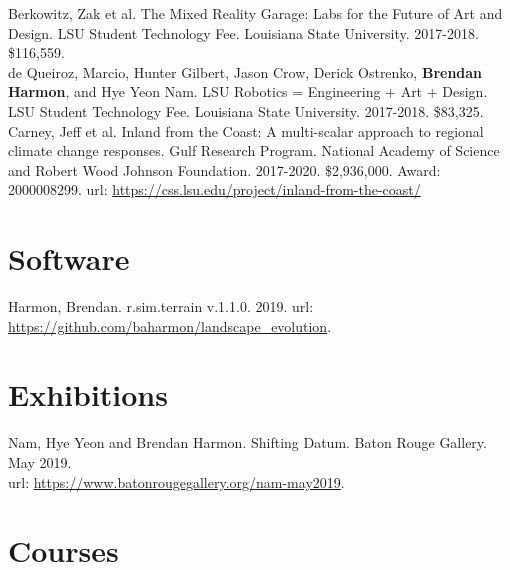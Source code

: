 \documentclass[]{baharmon-cv}
\begin{document}
Berkowitz, Zak et al. 
The Mixed Reality Garage: Labs for the Future of Art and Design. 
LSU Student Technology Fee. Louisiana State University. 
2017-2018. \$116,559.\\

de Queiroz, Marcio, Hunter Gilbert, Jason Crow, Derick Ostrenko, \textbf{Brendan Harmon}, and Hye Yeon Nam. 
LSU Robotics = Engineering + Art + Design. 
LSU Student Technology Fee. Louisiana State University. 
2017-2018. \$83,325.\\

Carney, Jeff et al. 
Inland from the Coast: A multi-scalar approach to regional climate change responses. 
Gulf Research Program. National Academy of Science and Robert Wood Johnson Foundation.
2017-2020. \$2,936,000. Award: 2000008299.
url: \url{https://css.lsu.edu/project/inland-from-the-coast/}\\

\sectiondivider \linebreak


\section{Software} 

Harmon, Brendan. r.sim.terrain v.1.1.0. 2019. url: \url{https://github.com/baharmon/landscape_evolution}.

\sectiondivider \linebreak


\section{Exhibitions} 

Nam, Hye Yeon and Brendan Harmon. Shifting Datum. Baton Rouge Gallery. May 2019.\\
url: \url{https://www.batonrougegallery.org/nam-may2019}.

\sectiondivider \linebreak


\section{Courses}
\end{document}
